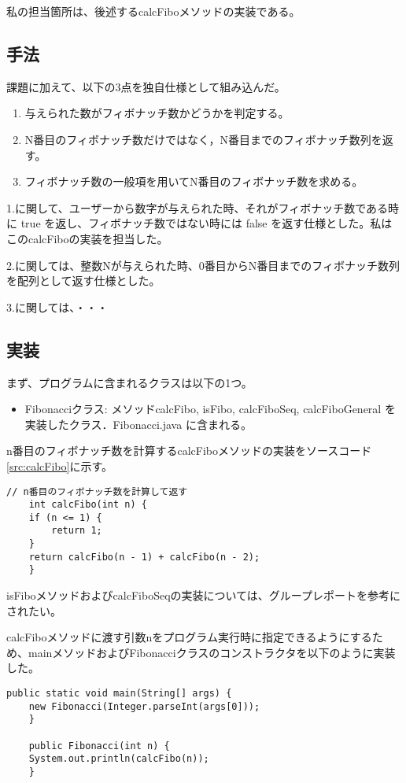 \documentclass[uplatex,12pt]{jsarticle}
\begin{document}
私の担当箇所は、後述するcalcFiboメソッドの実装である。
\subsection{手法}
課題に加えて、以下の3点を独自仕様として組み込んだ。

\begin{enumerate}
\item 与えられた数がフィボナッチ数かどうかを判定する。
\item N番目のフィボナッチ数だけではなく，N番目までのフィボナッチ数列を返す。
\item フィボナッチ数の一般項を用いてN番目のフィボナッチ数を求める。
\end{enumerate}

1.に関して、ユーザーから数字が与えられた時、それがフィボナッチ数である時に true を返し、フィボナッチ数ではない時には false を返す仕様とした。私はこのcalcFiboの実装を担当した。

2.に関しては、整数Nが与えられた時、0番目からN番目までのフィボナッチ数列を配列として返す仕様とした。

3.に関しては、・・・
\subsection{実装}

まず、プログラムに含まれるクラスは以下の1つ。
\begin{itemize}
\item Fibonacciクラス: メソッドcalcFibo, isFibo, calcFiboSeq, calcFiboGeneral を実装したクラス．Fibonacci.java に含まれる。
\end{itemize}

n番目のフィボナッチ数を計算するcalcFiboメソッドの実装をソースコード\ref{src:calcFibo}に示す。

\begin{lstlisting}[caption=calcFiboメソッド,label=src:calcFibo]
    // n番目のフィボナッチ数を計算して返す
    int calcFibo(int n) {
	if (n <= 1) {
	    return 1;
	}
	return calcFibo(n - 1) + calcFibo(n - 2);
    }
\end{lstlisting}

isFiboメソッドおよびcalcFiboSeqの実装については、グループレポートを参考にされたい。

calcFiboメソッドに渡す引数nをプログラム実行時に指定できるようにするため、mainメソッドおよびFibonacciクラスのコンストラクタを以下のように実装した。
\begin{lstlisting}[caption=mainメソッドとコンストラクタ,label=src:main]
    public static void main(String[] args) {
	new Fibonacci(Integer.parseInt(args[0]));
    }

    public Fibonacci(int n) {
	System.out.println(calcFibo(n));
    }
\end{lstlisting}
\end{document}
